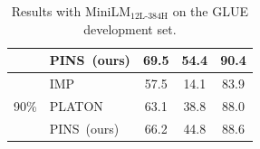 \documentclass[11pt]{article}
\begin{document}
\begin{table}[h]
\begin{tabular}{c|l|ccc}
			&PINS~(ours)                                             &   69.5                                                                                   &      54.4                                                                                 &  90.4                                                                                          \\
			\midrule
			\multirow{3}{*}{90\%}     &IMP                                              &   57.5                                                                                    &   14.1                                                                                     &   83.9                                                                                     \\
			& PLATON                                               &   63.1                                                                                   &  38.8                                                                                      &  88.0                                                                                        \\
			&PINS~(ours)                                             &   66.2                                                                                    &     44.8                                                                                  &   88.6                                                                                  \\
			\bottomrule                                     
		\end{tabular}
		\caption{Results with MiniLM$_{\text{12L-384H}}$ on the GLUE development set.}
		\label{table:electra}
	\end{table}
\end{document}
